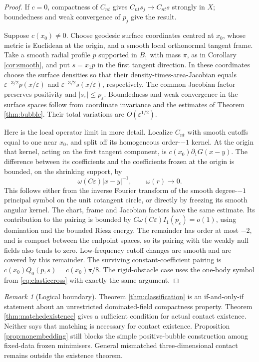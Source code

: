 \documentclass[11pt,a4paper]{article}
\theoremstyle{definition}\newtheorem{definition}[theorem]{Definition}
\theoremstyle{remark}\newtheorem{remark}[theorem]{Remark}
\numberwithin{equation}{section}
\begin{document}
\begin{proof}
If $c=0$, compactness of $C_{nt}$ gives $C_{nt}s_j\to C_{nt}s$ strongly in $X$; boundedness and weak convergence of $p_j$ give the result.

Suppose $c(x_0)\ne0$. Choose geodesic surface coordinates centred at $x_0$, whose metric is Euclidean at the origin, and a smooth local orthonormal tangent frame. Take a smooth radial profile $p$ supported in $B_1$ with mass $\pi$, as in Corollary \ref{cor:smooth}, and put $s=x_1p$ in the first tangent direction. In these coordinates choose the surface densities so that their density-times-area-Jacobian equals $\varepsilon^{-3/2}p(x/\varepsilon)$ and $\varepsilon^{-3/2}s(x/\varepsilon)$, respectively. The common Jacobian factor preserves positivity and $|s_\varepsilon|\le p_\varepsilon$. Boundedness and weak convergence in the surface spaces follow from coordinate invariance and the estimates of Theorem \ref{thm:bubble}. Their total variations are $O(\varepsilon^{1/2})$.

Here is the local operator limit in more detail. Localize $C_{nt}$ with smooth cutoffs equal to one near $x_0$, and split off its homogeneous order-$-1$ kernel. At the origin that kernel, acting on the first tangent component, is $c(x_0)\partial_1G(x-y)$. The difference between its coefficients and the coefficients frozen at the origin is bounded, on the shrinking support, by
\[
 \omega(C\varepsilon)|x-y|^{-1},\qquad \omega(r)\longrightarrow0.
\]
This follows either from the inverse Fourier transform of the smooth degree-$-1$ principal symbol on the unit cotangent circle, or directly by freezing its smooth angular kernel. The chart, frame and Jacobian factors have the same estimate. Its contribution to the pairing is bounded by $C\omega(C\varepsilon)I_1(p_\varepsilon)=o(1)$, using domination and the bounded Riesz energy. The remainder has order at most $-2$, and is compact between the endpoint spaces, so its pairing with the weakly null fields also tends to zero. Low-frequency cutoff changes are smooth and are covered by this remainder. The surviving constant-coefficient pairing is $c(x_0)Q_0(p,s)=c(x_0)\pi/8$. The rigid-obstacle case uses the one-body symbol from \eqref{eq:elasticcross} with exactly the same argument.
\end{proof}
\begin{remark}[Logical boundary]
Theorem \ref{thm:classification} is an if-and-only-if statement about an unrestricted dominated-field compactness property. Theorem \ref{thm:matchedexistence} gives a sufficient condition for actual contact existence. Neither says that matching is necessary for contact existence. Proposition \ref{prop:nonembedding} still blocks the simple positive-bubble construction among fixed-data frozen minimisers. General mismatched three-dimensional contact remains outside the existence theorem.
\end{remark}
\end{document}
